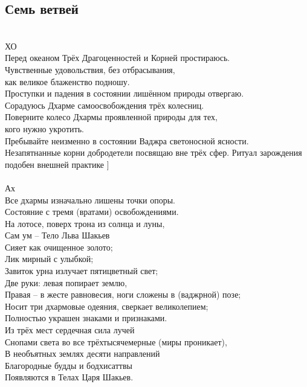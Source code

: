 \subsection*{Семь ветвей}
\\

ХО\\
Перед океаном Трёх Драгоценностей и Корней простираюсь.\\
Чувственные удовольствия, без отбрасывания, \\ \indent как великое блаженство подношу.\\
Проступки и падения в состоянии лишённом природы отвергаю.\\
Сорадуюсь Дхарме самоосвобождения трёх колесниц.\\
Поверните колесо Дхармы проявленной природы для тех, \\ \indent кого нужно укротить.\\
Пребывайте неизменно в состоянии Ваджра светоносной ясности.\\
Незапятнанные корни добродетели посвящаю вне трёх сфер.
\scriptsize
Ритуал зарождения подобен внешней практике
\normalsize ]
\\
\\
Ах\\
Все дхармы изначально лишены точки опоры.\\
Состояние с тремя (вратами) освобождениями.\\
На лотосе, поверх трона из солнца и луны,\\
Сам ум – Тело Льва Шакьев\\
Сияет как очищенное золото;\\
Лик мирный с улыбкой;\\
Завиток урна излучает пятицветный свет;\\
Две руки: левая попирает землю,\\
Правая – в жесте равновесия, ноги сложены в (ваджрной) позе;\\
Носит три дхармовые одеяния, сверкает великолепием;\\
Полностью украшен знаками и признаками.\\
Из трёх мест сердечная сила лучей \\
Снопами света во все трёхтысячемерные (миры проникает),\\
В необъятных землях десяти направлений\\
Благородные будды и бодхисаттвы\\
Появляются в Телах Царя Шакьев.\\
\newpage
